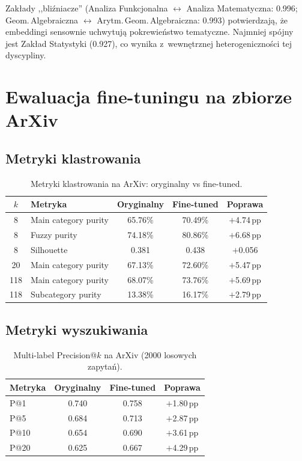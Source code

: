 \documentclass[a4paper,11pt]{article}
\begin{document}
Zakłady ,,bliźniacze'' (Analiza Funkcjonalna $\leftrightarrow$ Analiza Matematyczna: 0.996; Geom.\,Algebraiczna $\leftrightarrow$ Arytm.\,Geom.\,Algebraiczna: 0.993) potwierdzają, że embeddingi sensownie uchwytują pokrewieństwo tematyczne.
Najmniej spójny jest Zakład Statystyki (0.927), co wynika z~wewnętrznej heterogeniczności tej dyscypliny.


\section{Ewaluacja fine-tuningu na zbiorze ArXiv}

\subsection{Metryki klastrowania}

\begin{table}[H]
\centering
\caption{Metryki klastrowania na ArXiv: oryginalny vs fine-tuned.}
\label{tab:arxiv_clustering}
\begin{tabular}{clccc}
\toprule
$k$ & Metryka & Oryginalny & Fine-tuned & Poprawa \\
\midrule
8 & Main category purity & 65.76\% & 70.49\% & $+$4.74\,pp \\
8 & Fuzzy purity & 74.18\% & 80.86\% & $+$6.68\,pp \\
8 & Silhouette & 0.381 & 0.438 & $+$0.056 \\
\midrule
20 & Main category purity & 67.13\% & 72.60\% & $+$5.47\,pp \\
118 & Main category purity & 68.07\% & 73.76\% & $+$5.69\,pp \\
118 & Subcategory purity & 13.38\% & 16.17\% & $+$2.79\,pp \\
\bottomrule
\end{tabular}
\end{table}

\subsection{Metryki wyszukiwania}

\begin{table}[H]
\centering
\caption{Multi-label Precision@$k$ na ArXiv (2000 losowych zapytań).}
\label{tab:arxiv_retrieval}
\begin{tabular}{lccc}
\toprule
Metryka & Oryginalny & Fine-tuned & Poprawa \\
\midrule
P@1 & 0.740 & 0.758 & $+$1.80\,pp \\
P@5 & 0.684 & 0.713 & $+$2.87\,pp \\
P@10 & 0.654 & 0.690 & $+$3.61\,pp \\
P@20 & 0.625 & 0.667 & $+$4.29\,pp \\
\bottomrule
\end{tabular}
\end{table}
\end{document}
